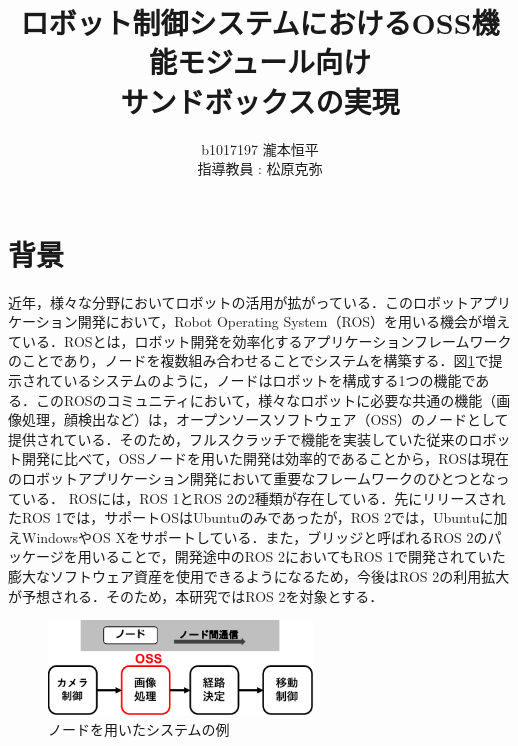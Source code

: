 \documentclass[11pt]{ujarticle} %
\author{
b1017197 瀧本恒平\\指導教員 : 松原克弥
}
\title{ロボット制御システムにおけるOSS機能モジュール向け\\サンドボックスの実現}
\begin{document}
\maketitle

\section{背景}
近年，様々な分野においてロボットの活用が拡がっている\cite{Pepper}\cite{RoBoHoN}．このロボットアプリケーション開発において，Robot Operating System（ROS）を用いる機会が増えている．ROSとは，ロボット開発を効率化するアプリケーションフレームワークのことであり，ノードを複数組み合わせることでシステムを構築する．図\ref{fig:nodeExp}で提示されているシステムのように，ノードはロボットを構成する1つの機能である．このROSのコミュニティにおいて，様々なロボットに必要な共通の機能（画像処理\cite{ROSexample}，顔検出\cite{facedetector}など）は，オープンソースソフトウェア（OSS）のノードとして提供されている．そのため，フルスクラッチで機能を実装していた従来のロボット開発に比べて，OSSノードを用いた開発は効率的であることから，ROSは現在のロボットアプリケーション開発において重要なフレームワークのひとつとなっている．
ROSには，ROS 1とROS 2の2種類が存在している．先にリリースされたROS 1では，サポートOSはUbuntuのみであったが，ROS 2では，Ubuntuに加えWindowsやOS Xをサポートしている．また，ブリッジと呼ばれるROS 2のパッケージを用いることで，開発途中のROS 2においてもROS 1で開発されていた膨大なソフトウェア資産を使用できるようになるため，今後はROS 2の利用拡大が予想される．そのため，本研究ではROS 2を対象とする．

\begin{figure}[h]
   \centering
   \includegraphics[width=7cm]{img/nodeExp.pdf}
   \caption{ノードを用いたシステムの例}
   \label{fig:nodeExp}
\end{figure}
\end{document}
